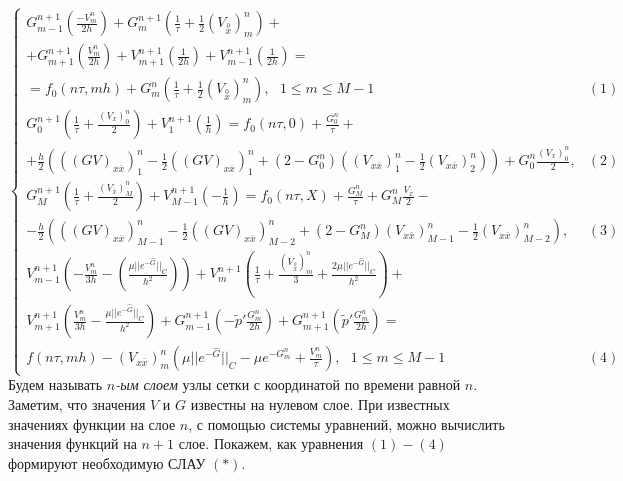 \documentclass[11pt]{article}
\newcommand{\wide}{
\stackrel{0}{x}
}
\begin{document}
$$
\begin{cases}
\displaystyle{
G_{m-1}^{n+1} \left(\frac{-V_{m}^n}{2h}\right) + G_m^{n+1} \left(\frac{1}{\tau} + \frac{1}{2}\left(V_{\wide}\right)_m^n\right) +}\\
\displaystyle{ +
G_{m+1}^{n+1} \left(\frac{V_m^n}{2h}\right) + V_{m+1}^{n+1} \left(\frac{1}{2h}\right) + V_{m-1}^{n+1}\left(\frac{1}{2h}\right) =} \\
\displaystyle{
= 
f_0 (n\tau, mh) + G_m^n \left(\frac{1}{\tau} 
+\frac{1}{2} \left(V_{\wide}\right)_m^n\right)
,\ \ \  1 \leqslant m \leqslant M - 1} & (1)\\
\displaystyle{
G_0^{n+1} \left(\frac{1}{\tau} + \frac{(V_x)_0^n}{2}\right)
 + V^{n+1}_1 \left(\frac{1}{h}\right) = 
 f_0 (n\tau, 0) + \frac{G_0^n}{\tau} + } \\
 \displaystyle{ +\frac{h}{2} \left( ((GV)_{x\overline{x}})_1^n -\frac{1}{2}((GV)_{x\overline{x}})_1^n + (2 - G_0^n)((V_{x\overline{x}})_1^n - \frac{1}{2}(V_{x\overline{x}})_2^n)\right) + G_0^n \frac{(V_x)_0^n}{2} }, & (2)\\
 \displaystyle{
G_{M}^{n+1} \left(\frac{1}{\tau} + \frac{\left(V_{\overline{x}}\right)_M^n}{2}\right) + V_{M-1}^{n+1} \left(-\frac{1}{h}\right) = 
f_0(n\tau, X) + \frac{G_M^n}{\tau} + G_M^n \frac{V_{\overline{x}}}{2} - } \\
\displaystyle{
-\frac{h}{2}\left(((GV)_{x\overline{x}})_{M-1}^n
-\frac{1}{2}((GV)_{x\overline{x}})_{M-2}^n + (2-G_M^n)(V_{x\overline{x}})_{M-1}^n - 
\frac{1}{2}(V_{x\overline{x}})_{M-2}^n\right)}, & (3)\\
\displaystyle{
V_{m-1}^{n+1} \left(-\frac{V_m^n}{3h}-\left(\frac{\mu \vert\vert e^{-\hat{G}}\vert\vert_C}{h^2} \right) \right) + 
V_m^{n+1} \left(\frac{1}{\tau} + \frac{(V_{\wide})_m^n}{3} + \frac{2\mu \vert\vert e^{-\hat{G}}\vert\vert_C}{h^2}\right) +} \\
\displaystyle {
V_{m+1}^{n+1}\left(\frac{V_m^n}{3h} - 
\frac{\mu \vert\vert e^{-\hat{G}}\vert\vert_C}{h^2}\right) + G_{m-1}^{n+1}\left(-\tilde{p}'\frac{G_m^n}{2h}\right) + 
G_{m+1}^{n+1}\left(
\tilde{p}'\frac{G_m^n}{2h}\right) = } \\
\displaystyle{
 f(n\tau, mh) - (V_{x\overline{x}})_m^n \left(\mu \vert\vert e^{-\hat{G}}\vert\vert_C - \mu e^{-G_m^n} + \frac{V_m^n}{\tau}\right),\ \ \ 1 \leqslant m \leqslant M-1} & (4)
\end{cases}
$$
Будем называть \textit{$n$-ым слоем} узлы сетки с координатой по времени равной $n$.
\enlargethispage{9\baselineskip}
Заметим, что значения $V$ и $G$ известны на нулевом слое.
При известных значениях функции на слое $n$, с помощью системы уравнений, можно вычислить значения функций на $n+1$ слое. Покажем, как уравнения $(1)-(4)$ формируют необходимую СЛАУ $(*)$.
\end{document}
